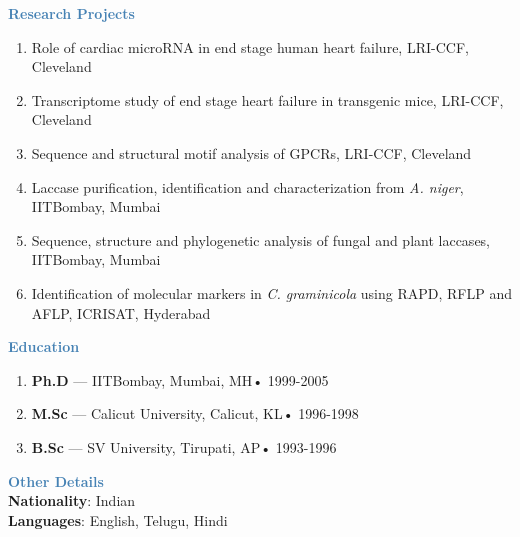 \documentclass[12pt]{article}
\begin{document}
\pagebreak
\noindent\textbf{\textcolor{steelblue}{Research Projects}}\\[-20pt]
\begin{enumerate}
	\item Role of cardiac microRNA in end stage human heart failure, LRI-CCF, Cleveland
	\item Transcriptome study of end stage heart failure in transgenic mice, LRI-CCF, Cleveland
	\item Sequence and structural motif analysis of GPCRs, LRI-CCF, Cleveland
	\item  Laccase purification, identification and characterization from \textit{A. niger}, IITBombay, Mumbai
	\item Sequence, structure and phylogenetic analysis of fungal and plant laccases, IITBombay, Mumbai
	\item Identification of molecular markers in \textit{C. graminicola} using RAPD, RFLP and AFLP, ICRISAT, Hyderabad
\end{enumerate}

\noindent\textbf{\textcolor{steelblue}{Education}}\\[-20pt]
\begin{enumerate}
	\setlength\itemsep{-2pt}
	\item \textbf{Ph.D} — IITBombay, Mumbai, MH• 1999-2005
	\item \textbf{M.Sc} — Calicut University, Calicut, KL• 1996-1998
	\item \textbf{B.Sc} — SV University, Tirupati, AP• 1993-1996
\end{enumerate}

\noindent\textbf{\textcolor{steelblue}{Other Details}}\\
\textbf{Nationality}: Indian\\
\textbf{Languages}: English, Telugu, Hindi
\end{document}
